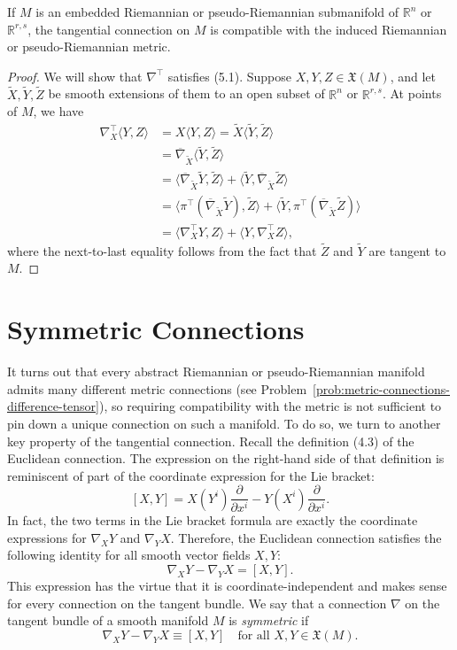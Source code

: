 \begin{proposition}
\label{prop:tangential-connection-compatible-metric}

If $M$ is an embedded Riemannian or pseudo-Riemannian submanifold of $\mathbb{R}^n$ or $\mathbb{R}^{r,s}$, the tangential connection on $M$ is compatible with the induced Riemannian or pseudo-Riemannian metric.

\begin{proof}
We will show that $\nabla^{\top}$ satisfies (5.1). Suppose $X, Y, Z \in \mathfrak{X}(M)$, and let $\tilde{X}, \tilde{Y}, \tilde{Z}$ be smooth extensions of them to an open subset of $\mathbb{R}^n$ or $\mathbb{R}^{r,s}$. At points of $M$, we have
\begin{align*}
\nabla^{\top}_X \langle Y, Z \rangle &= X \langle Y, Z \rangle = \tilde{X} \langle \tilde{Y}, \tilde{Z} \rangle \\
&= \overline{\nabla}_{\tilde{X}} \langle \tilde{Y}, \tilde{Z} \rangle \\
&= \langle \overline{\nabla}_{\tilde{X}} \tilde{Y}, \tilde{Z} \rangle + \langle \tilde{Y}, \overline{\nabla}_{\tilde{X}} \tilde{Z} \rangle \\
&= \langle \pi^{\top} (\overline{\nabla}_{\tilde{X}} \tilde{Y}), \tilde{Z} \rangle + \langle \tilde{Y}, \pi^{\top} (\overline{\nabla}_{\tilde{X}} \tilde{Z}) \rangle \\
&= \langle \nabla^{\top}_X Y, Z \rangle + \langle Y, \nabla^{\top}_X Z \rangle,
\end{align*}
where the next-to-last equality follows from the fact that $\tilde{Z}$ and $\tilde{Y}$ are tangent to $M$.
\end{proof}
\end{proposition}

\section{Symmetric Connections}

It turns out that every abstract Riemannian or pseudo-Riemannian manifold admits many different metric connections (see Problem~\ref{prob:metric-connections-difference-tensor}), so requiring compatibility with the metric is not sufficient to pin down a unique connection on such a manifold. To do so, we turn to another key property of the tangential connection. Recall the definition (4.3) of the Euclidean connection. The expression on the right-hand side of that definition is reminiscent of part of the coordinate expression for the Lie bracket:
\[
[X,Y] = X(Y^i) \frac{\partial}{\partial x^i} - Y(X^i) \frac{\partial}{\partial x^i}.
\]
In fact, the two terms in the Lie bracket formula are exactly the coordinate expressions for $\nabla_X Y$ and $\nabla_Y X$. Therefore, the Euclidean connection satisfies the following identity for all smooth vector fields $X, Y$:
\[
\nabla_X Y - \nabla_Y X = [X, Y].
\]
This expression has the virtue that it is coordinate-independent and makes sense for every connection on the tangent bundle. We say that a connection $\nabla$ on the tangent bundle of a smooth manifold $M$ is \emph{symmetric} if
\[
\nabla_X Y - \nabla_Y X \equiv [X, Y] \quad \text{for all } X, Y \in \mathfrak{X}(M).
\]

